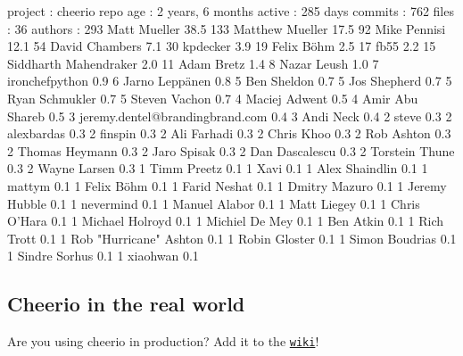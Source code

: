 \begin{DoxyCode}
project  : cheerio
 repo age : 2 years, 6 months
 active   : 285 days
 commits  : 762
 files    : 36
 authors  :
   293  Matt Mueller            38.5%
   133  Matthew Mueller         17.5%
    92  Mike Pennisi            12.1%
    54  David Chambers          7.1%
    30  kpdecker                3.9%
    19  Felix Böhm             2.5%
    17  fb55                    2.2%
    15  Siddharth Mahendraker   2.0%
    11  Adam Bretz              1.4%
     8  Nazar Leush             1.0%
     7  ironchefpython          0.9%
     6  Jarno Leppänen         0.8%
     5  Ben Sheldon             0.7%
     5  Jos Shepherd            0.7%
     5  Ryan Schmukler          0.7%
     5  Steven Vachon           0.7%
     4  Maciej Adwent           0.5%
     4  Amir Abu Shareb         0.5%
     3  jeremy.dentel@brandingbrand.com 0.4%
     3  Andi Neck               0.4%
     2  steve                   0.3%
     2  alexbardas              0.3%
     2  finspin                 0.3%
     2  Ali Farhadi             0.3%
     2  Chris Khoo              0.3%
     2  Rob Ashton              0.3%
     2  Thomas Heymann          0.3%
     2  Jaro Spisak             0.3%
     2  Dan Dascalescu          0.3%
     2  Torstein Thune          0.3%
     2  Wayne Larsen            0.3%
     1  Timm Preetz             0.1%
     1  Xavi                    0.1%
     1  Alex Shaindlin          0.1%
     1  mattym                  0.1%
     1  Felix Böhm            0.1%
     1  Farid Neshat            0.1%
     1  Dmitry Mazuro           0.1%
     1  Jeremy Hubble           0.1%
     1  nevermind               0.1%
     1  Manuel Alabor           0.1%
     1  Matt Liegey             0.1%
     1  Chris O'Hara            0.1%
     1  Michael Holroyd         0.1%
     1  Michiel De Mey          0.1%
     1  Ben Atkin               0.1%
     1  Rich Trott              0.1%
     1  Rob "Hurricane" Ashton  0.1%
     1  Robin Gloster           0.1%
     1  Simon Boudrias          0.1%
     1  Sindre Sorhus           0.1%
     1  xiaohwan                0.1%
\end{DoxyCode}


\subsection*{Cheerio in the real world}

Are you using cheerio in production? Add it to the \href{https://github.com/cheeriojs/cheerio/wiki/Cheerio-in-Production}{\tt wiki}!

